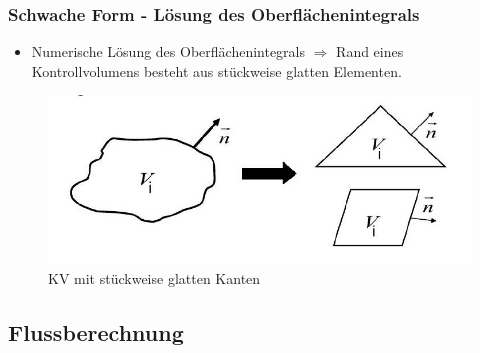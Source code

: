 \documentclass[
	11pt, %
	aspectratio=169, %
]{beamer}
\begin{document}
\begin{frame}
	\frametitle{Schwache Form - Lösung des Oberflächenintegrals}
	\begin{itemize}
		\item Numerische Lösung des Oberflächenintegrals $\Rightarrow$ Rand eines Kontrollvolumens besteht aus stückweise glatten Elementen.
	\end{itemize}
	\begin{figure}
		\includegraphics[width=0.7\linewidth]{Cells.JPG}
		\caption{KV mit stückweise glatten Kanten}
	\end{figure}
\end{frame}


\subsection{Flussberechnung}
\end{document}
